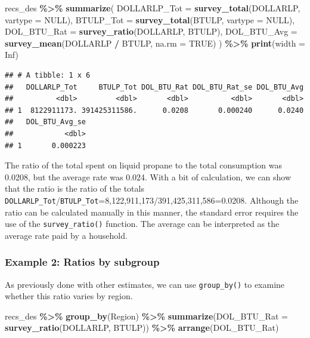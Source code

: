 \documentclass[
]{krantz}
\makeatletter
\newenvironment{Shaded}{\begin{snugshade}}{\end{snugshade}}
\newcommand{\AttributeTok}[1]{\textcolor[rgb]{0.27,0.27,0.27}{#1}}
\newcommand{\ConstantTok}[1]{\textcolor[rgb]{0.37,0.37,0.37}{#1}}
\newcommand{\FunctionTok}[1]{\textcolor[rgb]{0.27,0.27,0.27}{\textbf{#1}}}
\newcommand{\NormalTok}[1]{#1}
\newcommand{\SpecialCharTok}[1]{\textcolor[rgb]{0.43,0.43,0.43}{\textbf{#1}}}
\newenvironment{kframe}{%
\medskip{}
\setlength{\fboxsep}{.8em}
 \def\at@end@of@kframe{}%
 \ifinner\ifhmode%
  \def\at@end@of@kframe{\end{minipage}}%
  \begin{minipage}{\columnwidth}%
 \fi\fi%
 \def\FrameCommand##1{\hskip\@totalleftmargin \hskip-\fboxsep
 \colorbox{shadecolor}{##1}\hskip-\fboxsep
     \hskip-\linewidth \hskip-\@totalleftmargin \hskip\columnwidth}%
 \MakeFramed {\advance\hsize-\width
   \@totalleftmargin\z@ \linewidth\hsize
   \@setminipage}}%
 {\par\unskip\endMakeFramed%
 \at@end@of@kframe}
\renewenvironment{Shaded}{\begin{kframe}}{\end{kframe}}
\makeatother
\begin{document}
\begin{Shaded}
\begin{Highlighting}[]
\NormalTok{recs\_des }\SpecialCharTok{\%\textgreater{}\%}
  \FunctionTok{summarize}\NormalTok{(}
    \AttributeTok{DOLLARLP\_Tot =} \FunctionTok{survey\_total}\NormalTok{(DOLLARLP, }\AttributeTok{vartype =} \ConstantTok{NULL}\NormalTok{),}
    \AttributeTok{BTULP\_Tot =} \FunctionTok{survey\_total}\NormalTok{(BTULP, }\AttributeTok{vartype =} \ConstantTok{NULL}\NormalTok{),}
    \AttributeTok{DOL\_BTU\_Rat =} \FunctionTok{survey\_ratio}\NormalTok{(DOLLARLP, BTULP),}
    \AttributeTok{DOL\_BTU\_Avg =} \FunctionTok{survey\_mean}\NormalTok{(DOLLARLP }\SpecialCharTok{/}\NormalTok{ BTULP, }\AttributeTok{na.rm =} \ConstantTok{TRUE}\NormalTok{)}
\NormalTok{  ) }\SpecialCharTok{\%\textgreater{}\%}
  \FunctionTok{print}\NormalTok{(}\AttributeTok{width =} \ConstantTok{Inf}\NormalTok{)}
\end{Highlighting}
\end{Shaded}

\begin{verbatim}
## # A tibble: 1 x 6
##   DOLLARLP_Tot     BTULP_Tot DOL_BTU_Rat DOL_BTU_Rat_se DOL_BTU_Avg
##          <dbl>         <dbl>       <dbl>          <dbl>       <dbl>
## 1  8122911173. 391425311586.      0.0208       0.000240      0.0240
##   DOL_BTU_Avg_se
##            <dbl>
## 1       0.000223
\end{verbatim}

The ratio of the total spent on liquid propane to the total consumption was 0.0208, but the average rate was 0.024. With a bit of calculation, we can show that the ratio is the ratio of the totals \texttt{DOLLARLP\_Tot}/\texttt{BTULP\_Tot}=8,122,911,173/391,425,311,586=0.0208. Although the ratio can be calculated manually in this manner, the standard error requires the use of the \texttt{survey\_ratio()} function. The average can be interpreted as the average rate paid by a household.

\hypertarget{example-2-ratios-by-subgroup}{%
\subsubsection*{Example 2: Ratios by subgroup}\label{example-2-ratios-by-subgroup}}


As previously done with other estimates, we can use \texttt{group\_by()} to examine whether this ratio varies by region.

\begin{Shaded}
\begin{Highlighting}[]
\NormalTok{recs\_des }\SpecialCharTok{\%\textgreater{}\%}
  \FunctionTok{group\_by}\NormalTok{(Region) }\SpecialCharTok{\%\textgreater{}\%}
  \FunctionTok{summarize}\NormalTok{(}\AttributeTok{DOL\_BTU\_Rat =} \FunctionTok{survey\_ratio}\NormalTok{(DOLLARLP, BTULP)) }\SpecialCharTok{\%\textgreater{}\%}
  \FunctionTok{arrange}\NormalTok{(DOL\_BTU\_Rat)}
\end{Highlighting}
\end{Shaded}
\end{document}
